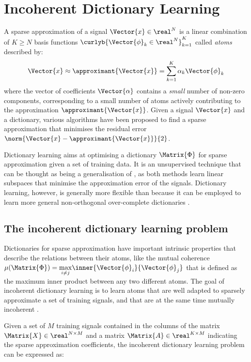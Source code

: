 \documentclass{article}
\def \fea{\Vector{x}} 	%
\def \Feas{\Matrix{X}} 	%
\def \nDim{N} 			%
\def \Dic{\Matrix{\Phi}} %
\def \nAto{K} 			%
\def \iAto{k} 			%
\def \atom{\Vector{\phi}}%
\def \nFea{M}			%
\def \Coeff{\Matrix{A}} 	%
\def \coeff{\Vector{\alpha}}%
\begin{document}
\section{Incoherent Dictionary Learning}\label{sec:idl}
A sparse approximation of a signal $\fea\in\real^{\nDim}$ is a linear combination of $\nAto\geq\nDim$ basis functions $\curlyb{\atom_{\iAto}\in\real^{\nDim}}_{\iAto=1}^{\nAto}$ called \emph{atoms} described by:
\begin{equation}
	\fea \approx \approximant{\fea} = \sum_{\iAto=1}^{\nAto} \alpha_{\iAto}\atom_{\iAto}
\end{equation}
where the vector of coefficients $\coeff$ contains a \emph{small} number of non-zero components, corresponding to a small number of atoms actively contributing to the approximation $\approximant{\fea}$. Given a signal $\fea$ and a dictionary, various algorithms have been proposed to find a sparse approximation that minimises the residual error $\norm{\fea-\approximant{\fea}}{2}$\cite{Elad2010Sp}.

Dictionary learning aims at optimising a dictionary $\Dic$ for sparse approximation given a set of training data. It is an unsupervised technique that can be thought as being a generalisation of , as both methods learn linear subspaces that minimise the approximation error of the signals. Dictionary learning, however, is generally more flexible than  because it can be employed to learn more general non-orthogonal over-complete dictionaries \cite{Rubinstein2010Di}.

\subsection{The incoherent dictionary learning problem}
Dictionaries for sparse approximation have important intrinsic properties that describe the relations between their atoms, like the mutual coherence $\mu(\Dic)=\underset{i\neq j}{\max}{\inner{\atom_{i}}{\atom_{j}}}$ that is defined as the maximum inner product between any two different atoms. The goal of incoherent dictionary learning is to learn atoms that are well adapted to sparsely approximate a set of training signals, and that are at the same time mutually incoherent \cite{Barchiesi2013Le}. 

Given a set of $\nFea$ training signals contained in the columns of the matrix $\Feas \in \real^{\nDim\times\nFea}$ and a matrix $\Coeff\in\real^{\nAto\times\nFea}$ indicating the sparse approximation coefficients, the incoherent dictionary learning problem can be expressed as:
\end{document}
